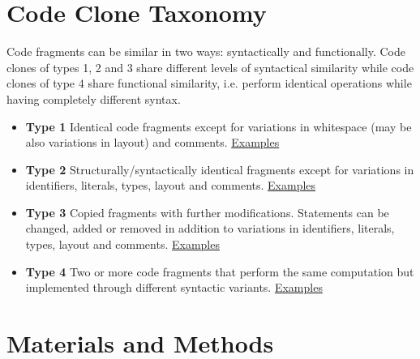 \documentclass[a0,portrait]{a0poster}
\begin{document}
\begin{multicols}{2}

\section*{Code Clone Taxonomy}

Code fragments can be similar in two ways: syntactically and functionally. Code clones of 
types 1, 2 and 3 share different levels of syntactical similarity while code clones of type 4
share functional similarity, i.e. perform identical operations while having completely different
syntax.

\begin{itemize}
\item \textbf{Type 1} Identical code fragments except for variations in whitespace (may be also
variations in layout) and comments. 
\href{https://gist.github.com/omtcyf0/33a00a4f4406f5933526}{\color{blue} Examples}

\item \textbf{Type 2} Structurally/syntactically identical fragments except for variations in identifiers,
literals, types, layout and comments.
\href{https://gist.github.com/omtcyf0/1e6812f98302f374da53}{\color{blue} Examples}

\item \textbf{Type 3} Copied fragments with further modifications. Statements can be changed,
added or removed in addition to variations in identifiers, literals, types, layout
and comments.
\href{https://gist.github.com/omtcyf0/dde978ef6696cf47aff8}{\color{blue} Examples}

\item \textbf{Type 4} Two or more code fragments that perform the same computation but
implemented through different syntactic variants.
\href{https://gist.github.com/omtcyf0/2ce1c8962d9a5552cf35}{\color{blue} Examples}
\end{itemize}


\section*{Materials and Methods}


\end{multicols}
\end{document}
